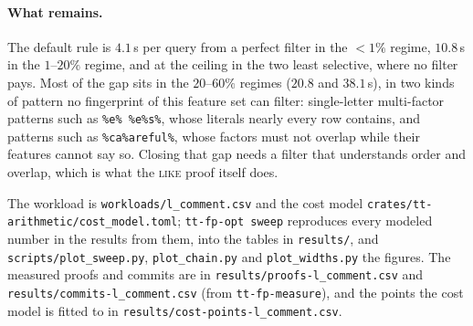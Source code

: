 \paragraph{What remains.}
The default rule is $4.1$\,s per query from a perfect filter in the
$<1\%$ regime, $10.8$\,s in the $1$--$20\%$ regime, and at the ceiling
in the two least selective, where no filter pays. Most of the gap sits in
the $20$--$60\%$ regimes ($20.8$ and $38.1$\,s), in two kinds of pattern
no fingerprint of this feature set can filter:
single-letter multi-factor patterns such as \texttt{\%e\%\ \%e\%s\%},
whose literals nearly every row contains, and patterns such as
\texttt{\%ca\%areful\%}, whose factors must not overlap while their
features cannot say so. Closing that gap needs a filter that understands
order and overlap, which is what the \textsc{like} proof itself does.

The workload is \texttt{workloads/l\_comment.csv} and the cost model
\texttt{crates/tt-arithmetic/cost\_model.toml}; \texttt{tt-fp-opt
sweep} reproduces every modeled number in the results from them, into
the tables in \texttt{results/}, and \texttt{scripts/plot\_sweep.py},
\texttt{plot\_chain.py} and \texttt{plot\_widths.py} the figures. The
measured proofs and commits are in \texttt{results/proofs-l\_comment.csv}
and \texttt{results/commits-l\_comment.csv} (from
\texttt{tt-fp-measure}), and the points the cost model is fitted to in
\texttt{results/cost-points-l\_comment.csv}.
